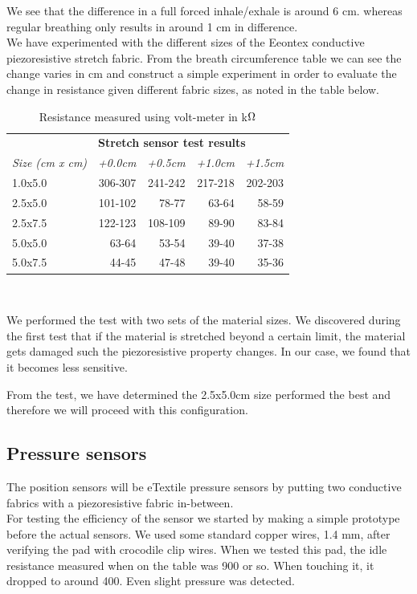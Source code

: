\documentclass{sigchi-ext}
\begin{document}
We see that the difference in a full forced inhale/exhale is around 6 cm. whereas regular
breathing only results in around 1 cm in difference.\\
We have experimented with the different sizes of the Eeontex conductive piezoresistive
stretch fabric. From the breath circumference table we can see the change varies in cm and construct a simple experiment in order to evaluate the change in resistance given
different fabric sizes, as noted in the table below.


\begin{table}[H]
  \centering
  \begin{tabular}{l r r r r}
    & \multicolumn{4}{l}{\small{\textbf{Stretch sensor test results}}} \\
    \cmidrule(r){1-2}
    {\small\textit{Size (cm x cm)}}
    & {\small \textit{+0.0cm}}
    & {\small \textit{+0.5cm}}
    & {\small \textit{+1.0cm}}
    & {\small \textit{+1.5cm}} \\
    \midrule
    1.0x5.0    & 306-307 & 241-242 & 217-218 & 202-203\\
    2.5x5.0    & 101-102 & 78-77 & 63-64 & 58-59 \\
    2.5x7.5    & 122-123 & 108-109 & 89-90 & 83-84 \\
    5.0x5.0    & 63-64 & 53-54 & 39-40 & 37-38 \\
    5.0x7.5    & 44-45 & 47-48 & 39-40 & 35-36 \\
  \end{tabular}
  \caption{Resistance measured using volt-meter in k$\ohm$}~\label{tab:stretch-test}
\end{table}

We performed the test with two sets of the material sizes.
We discovered during the first test that if the material
is stretched beyond a certain limit, the material gets
damaged such the piezoresistive property changes. In our case,
we found that it becomes less sensitive.

From the test, we have determined the 2.5x5.0cm size
performed the best and therefore we will proceed with this
configuration.

\subsection{Pressure sensors}
The position sensors will be eTextile pressure sensors by putting two conductive
fabrics with a piezoresistive fabric in-between.\\
For testing
the efficiency of the sensor we started by making a
simple prototype before the actual sensors.
We used some standard copper wires, 1.4 mm, after verifying the pad with
crocodile clip wires. When we tested this pad, the idle resistance measured when on the table was
900 or so. When touching it, it dropped to around 400. Even slight pressure
was detected.
\end{document}
